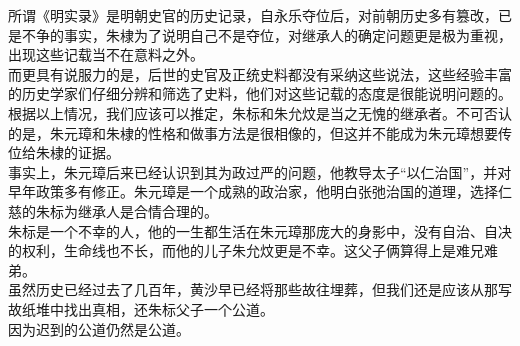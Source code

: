\begin{multicols}{\theparacolNo}
所谓《明实录》是明朝史官的历史记录，自永乐夺位后，对前朝历史多有篡改，已是不争的事实，朱棣为了说明自己不是夺位，对继承人的确定问题更是极为重视，出现这些记载当不在意料之外。\\

而更具有说服力的是，后世的史官及正统史料都没有采纳这些说法，这些经验丰富的历史学家们仔细分辨和筛选了史料，他们对这些记载的态度是很能说明问题的。\\

根据以上情况，我们应该可以推定，朱标和朱允炆是当之无愧的继承者。不可否认的是，朱元璋和朱棣的性格和做事方法是很相像的，但这并不能成为朱元璋想要传位给朱棣的证据。\\

事实上，朱元璋后来已经认识到其为政过严的问题，他教导太子“以仁治国”，并对早年政策多有修正。朱元璋是一个成熟的政治家，他明白张弛治国的道理，选择仁慈的朱标为继承人是合情合理的。\\

朱标是一个不幸的人，他的一生都生活在朱元璋那庞大的身影中，没有自治、自决的权利，生命线也不长，而他的儿子朱允炆更是不幸。这父子俩算得上是难兄难弟。\\

虽然历史已经过去了几百年，黄沙早已经将那些故往埋葬，但我们还是应该从那写故纸堆中找出真相，还朱标父子一个公道。\\

因为迟到的公道仍然是公道。\\
\ifnum{}
	\end{multicols}
\fi
\newpage
